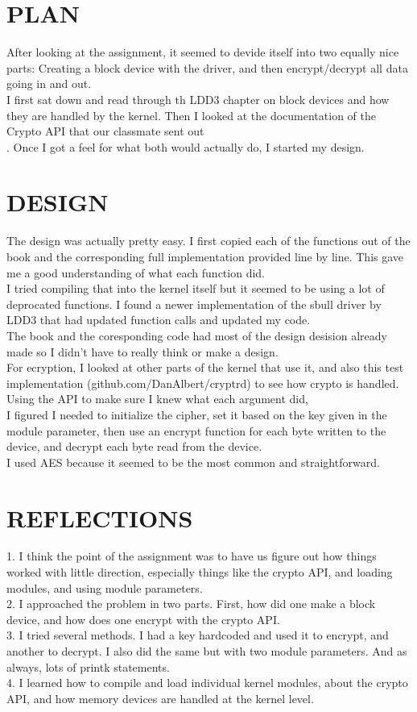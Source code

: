 \documentclass[letterpaper,10pt,titlepage]{article}
\begin{document}
\section{PLAN}
    After looking at the assignment, it seemed to devide itself into two equally nice parts: Creating a block device with the driver, and then encrypt/decrypt all data going in and out.\\
    I first sat down and read through th LDD3 chapter on block devices and how they are handled by the kernel. Then I looked at the documentation of the Crypto API that our classmate sent out\\.
    Once I got a feel for what both would actually do, I started my design.

\section{DESIGN}
    The design was actually pretty easy. I first copied each of the functions out of the book and the corresponding full implementation provided line by line. This gave me a good understanding of what each function did.\\
    I tried compiling that into the kernel itself but it seemed to be using a lot of deprocated functions. I found a newer implementation of the sbull driver by LDD3 that had updated function calls and updated my code.\\
    The book and the coresponding code had most of the design desision already made so I didn't have to really think or make a design.\\
    For ecryption, I looked at other parts of the kernel that use it, and also this test implementation (github.com/DanAlbert/cryptrd) to see how crypto is handled. Using the API to make sure I knew what each argument did,\\
    I figured I needed to initialize the cipher, set it based on the key given in the module parameter, then use an encrypt function for each byte written to the device, and decrypt each byte read from the device.\\
    I used AES because it seemed to be the most common and straightforward.

\section{REFLECTIONS}
    1. I think the point of the assignment was to have us figure out how things worked with little direction, especially things like the crypto API, and loading modules, and using module parameters.\\
    2. I approached the problem in two parts. First, how did one make a block device, and how does one encrypt with the crypto API.\\
    3. I tried several methods. I had a key hardcoded and used it to encrypt, and another to decrypt. I also did the same but with two module parameters. And as always, lots of printk statements. \\
    4. I learned how to compile and load individual kernel modules, about the crypto API, and how memory devices are handled at the kernel level. \\ 


\end{document}
